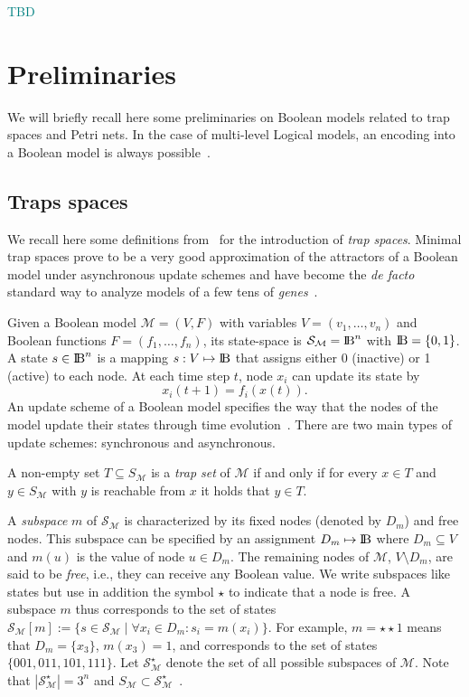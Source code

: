 \documentclass[runningheads]{llncs}
\newcommand{\sylvain}[1]{\textcolor{teal}{#1}}
\newcommand{\bbbb}{{\rm I\!B}}
\begin{document}
\sylvain{TBD}

\section{Preliminaries}

We will briefly recall here some preliminaries on Boolean models related to trap spaces and Petri nets.
In the case of multi-level Logical models, an encoding into a Boolean model is always possible~\cite{Didier2011}.

\subsection{Traps spaces}

We recall here some definitions from~\cite{klarner2015computing} for the introduction of \emph{trap spaces}.
Minimal trap spaces prove to be a very good approximation of the attractors of a Boolean model under asynchronous update schemes and have become the \emph{de facto} standard way to analyze models of a few tens of \emph{genes}~\cite{klarner2017pyboolnet,cifuentes2020control}.

Given a Boolean model \(\mathcal{M} = (V, F)\) with variables \(V=(v_{1},\dots,v_{n})\) and Boolean functions \(F=(f_{1},\dots,f_{n})\), its state-space is \(\mathcal{S}_{\mathcal{M}} =\bbbb^{n}\) with \(\bbbb = \{0, 1\}\). A state \(s \in \bbbb^{n}\) is a mapping \(s : V \mapsto \bbbb\) that assigns either 0 (inactive) or 1 (active) to each node. At each time step \(t\), node \(x_i\) can update its state by
\[x_i(t + 1) = f_i(x(t)).\] An update scheme of a Boolean model specifies the way that the nodes of the model update their states through time evolution~\cite{thomas1991regulatory}. There are two main types of update schemes: synchronous and asynchronous.

A non-empty set \(T \subseteq S_{\mathcal{M}}\) is a \emph{trap set} of \(\mathcal{M}\) if and only if for every \(x \in T\) and \(y \in S_{\mathcal{M}}\) with \(y\) is reachable from \(x\) it holds that \(y \in T\).

A \emph{subspace} \(m\) of \(\mathcal{S}_{\mathcal{M}}\) is characterized by its fixed nodes (denoted by \(D_m\)) and free nodes.
This subspace can be specified by an assignment \(D_m \mapsto \bbbb\) where \(D_m \subseteq V\) and \(m(u)\) is the value of node \(u \in D_m\).
The remaining nodes of \(\mathcal{M}\), \(V \setminus D_m\), are said to be \emph{free}, i.e., they can receive any Boolean value.
We write subspaces like states but use in addition the symbol \(\star\) to indicate that a node is free.
A subspace \(m\) thus corresponds to the set of states \(\mathcal{S}_{\mathcal{M}}[m] := \{s \in \mathcal{S}_{\mathcal{M}}\;|\;\forall x_i \in D_m : s_i = m(x_i)\}\).
For example, \(m = \star\star1\) means that \(D_m = \{x_3\}\), \(m(x_3) = 1\), and corresponds to the set of states \(\{001, 011, 101, 111\}\).
Let \(\mathcal{S}_{\mathcal{M}}^{\star}\) denote the set of all possible subspaces of \(\mathcal{M}\). Note that \(\left|\mathcal{S}_{\mathcal{M}}^{\star}\right| = 3^n\) and \(S_{\mathcal{M}} \subset \mathcal{S}_{\mathcal{M}}^{\star}\)~\cite{klarner2015computing}.
\end{document}
